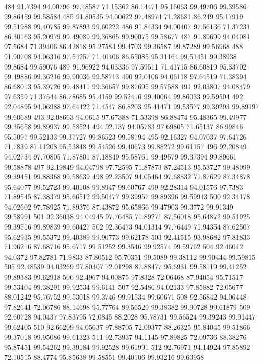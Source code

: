484	91.7394	94.00796	97.48587	71.15362	86.14471	95.16063	99.49706	99.39586	99.86459	99.58584
485	91.80535	94.00622	97.48974	71.28681	86.249	95.17919	99.51988	99.40785	99.87893	99.60222
486	91.84334	94.00407	97.56136	71.37231	86.30163	95.20979	99.49089	99.36865	99.90075	99.58677
487	91.89699	94.04081	97.5684	71.39406	86.42818	95.27584	99.4703	99.36587	99.87289	99.56968
488	91.90708	94.06316	97.54257	71.40406	86.55085	95.31164	99.51451	99.38938	99.8684	99.59076
489	91.96922	94.03336	97.59511	71.41715	86.60819	95.33702	99.49886	99.36216	99.90036	99.58713
490	92.0106	94.06118	97.64519	71.38394	86.68013	95.39726	99.48411	99.36657	99.87695	99.57588
491	92.03807	94.08479	97.6359	71.37544	86.78685	95.4159	99.52416	99.40064	99.86033	99.59504
492	92.04895	94.06988	97.64422	71.4547	86.8203	95.41471	99.53577	99.39293	99.89197	99.60689
493	92.08663	94.0615	97.67388	71.53398	86.88474	95.48365	99.49977	99.35658	99.89937	99.58524
494	92.137	94.05783	97.69805	71.65137	86.99846	95.5097	99.52133	99.37727	99.86523	99.58794
495	92.16327	94.07037	97.64726	71.7839	87.11208	95.53848	99.54526	99.40673	99.88272	99.61157
496	92.20849	94.02734	97.70805	71.87801	87.18849	95.58761	99.49579	99.37394	99.89661	99.58878
497	92.19849	94.04798	97.72595	71.87873	87.24513	95.53727	99.48099	99.39451	99.88368	99.58639
498	92.23507	94.05464	97.68832	71.87629	87.34878	95.64077	99.52723	99.40108	99.8947	99.60767
499	92.28314	94.01576	97.7383	71.89545	87.38379	95.66512	99.50477	99.39957	99.89396	99.59943
500	92.34178	94.02602	97.78925	71.89376	87.43872	95.65866	99.47903	99.3772	99.91349	99.58991
501	92.36038	94.04945	97.76485	71.89271	87.56018	95.64872	99.51925	99.39516	99.89839	99.60427
502	92.36473	94.01314	97.76449	71.94354	87.62507	95.62935	99.55372	99.40389	99.90773	99.62178
503	92.41515	93.98682	97.81833	71.96216	87.68716	95.6717	99.51252	99.3546	99.92574	99.59762
504	92.46042	94.0372	97.82781	71.9833	87.80512	95.70351	99.5089	99.38112	99.90444	99.59815
505	92.48539	94.03269	97.80307	72.01298	87.88477	95.6931	99.58119	99.41252	99.89383	99.62918
506	92.4967	94.00875	97.8328	72.06468	87.94054	95.71517	99.53404	99.38291	99.92534	99.6141
507	92.5486	94.02133	97.85882	72.05677	88.01242	95.76752	99.53018	99.3746	99.91534	99.60671
508	92.56842	94.06448	97.82641	72.06786	88.14698	95.77764	99.56529	99.38382	99.90728	99.61879
509	92.60728	94.0437	97.83795	72.0845	88.2028	95.78731	99.56524	99.39243	99.91447	99.62405
510	92.66209	94.05637	97.88705	72.09377	88.26325	95.84045	99.51866	99.37018	99.95086	99.61323
511	92.73937	94.1145	97.89825	72.09736	88.38276	95.87451	99.54262	99.39184	99.92528	99.61991
512	92.76971	94.14924	97.85892	72.10515	88.4774	95.85638	99.58551	99.40106	99.93216	99.63958
